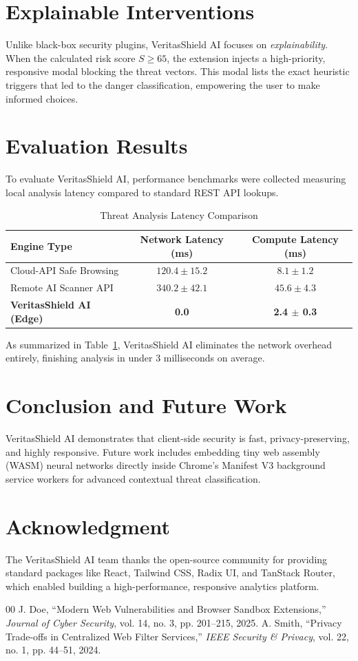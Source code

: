 \documentclass[conference]{IEEEtran}
\begin{document}
\section{Explainable Interventions}
Unlike black-box security plugins, VeritasShield AI focuses on \textit{explainability}. When the calculated risk score $S \ge 65$, the extension injects a high-priority, responsive modal blocking the threat vectors. This modal lists the exact heuristic triggers that led to the danger classification, empowering the user to make informed choices.

\section{Evaluation Results}
To evaluate VeritasShield AI, performance benchmarks were collected measuring local analysis latency compared to standard REST API lookups. 

\begin{table}[htbp]
\caption{Threat Analysis Latency Comparison}
\centering
\begin{tabular}{lcc}
\toprule
\textbf{Engine Type} & \textbf{Network Latency (ms)} & \textbf{Compute Latency (ms)} \\
\midrule
Cloud-API Safe Browsing & $120.4 \pm 15.2$ & $8.1 \pm 1.2$ \\
Remote AI Scanner API & $340.2 \pm 42.1$ & $45.6 \pm 4.3$ \\
\textbf{VeritasShield AI (Edge)} & \textbf{0.0} & \textbf{2.4 $\pm$ 0.3} \\
\bottomrule
\end{tabular}
\label{tab:latency}
\end{table}

As summarized in Table~\ref{tab:latency}, VeritasShield AI eliminates the network overhead entirely, finishing analysis in under 3 milliseconds on average.

\section{Conclusion and Future Work}
VeritasShield AI demonstrates that client-side security is fast, privacy-preserving, and highly responsive. Future work includes embedding tiny web assembly (WASM) neural networks directly inside Chrome's Manifest V3 background service workers for advanced contextual threat classification.

\section*{Acknowledgment}
The VeritasShield AI team thanks the open-source community for providing standard packages like React, Tailwind CSS, Radix UI, and TanStack Router, which enabled building a high-performance, responsive analytics platform.

\begin{thebibliography}{00}
 J. Doe, ``Modern Web Vulnerabilities and Browser Sandbox Extensions,'' \textit{Journal of Cyber Security}, vol. 14, no. 3, pp. 201--215, 2025.
 A. Smith, ``Privacy Trade-offs in Centralized Web Filter Services,'' \textit{IEEE Security \& Privacy}, vol. 22, no. 1, pp. 44--51, 2024.
\end{thebibliography}
\end{document}
